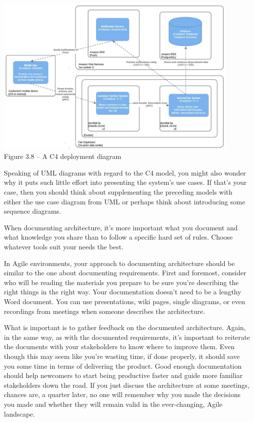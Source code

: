 \begin{center}
\includegraphics[width=0.9\textwidth]{content/1/chapter3/images/8.jpg}\\
Figure 3.8 – A C4 deployment diagram
\end{center}

Speaking of UML diagrams with regard to the C4 model, you might also wonder why it puts such little effort into presenting the system's use cases. If that's your case, then you should think about supplementing the preceding models with either the use case diagram from UML or perhaps think about introducing some sequence diagrams.

When documenting architecture, it's more important what you document and what knowledge you share than to follow a specific hard set of rules. Choose whatever tools suit your needs the best.


In Agile environments, your approach to documenting architecture should be similar to the one about documenting requirements. First and foremost, consider who will be reading the materials you prepare to be sure you're describing the right things in the right way. Your documentation doesn't need to be a lengthy Word document. You can use presentations, wiki pages, single diagrams, or even recordings from meetings when someone describes the architecture.

What is important is to gather feedback on the documented architecture. Again, in the same way, as with the documented requirements, it's important to reiterate the documents with your stakeholders to know where to improve them. Even though this may seem like you're wasting time, if done properly, it should save you some time in terms of delivering the product. Good enough documentation should help newcomers to start being productive faster and guide more familiar stakeholders down the road. If you just discuss the architecture at some meetings, chances are, a quarter later, no one will remember why you made the decisions you made and whether they will remain valid in the ever-changing, Agile landscape.


